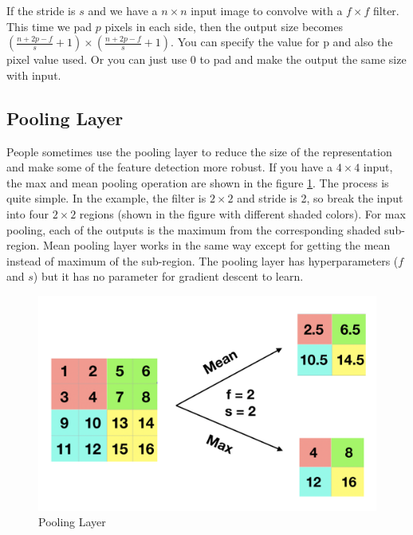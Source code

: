\documentclass[12pt,]{krantz}
\begin{document}
If the stride is \(s\) and we have a \(n \times n\) input image to convolve with a \(f \times f\) filter. This time we pad \(p\) pixels in each side, then the output size becomes \((\frac{n + 2p -f}{s} + 1) \times (\frac{n + 2p -f}{s} + 1)\). You can specify the value for p and also the pixel value used. Or you can just use 0 to pad and make the output the same size with input.

\hypertarget{pooling-layer}{%
\subsection{Pooling Layer}\label{pooling-layer}}

People sometimes use the pooling layer to reduce the size of the representation and make some of the feature detection more robust. If you have a \(4 \times 4\) input, the max and mean pooling operation are shown in the figure \ref{fig:poolinglayer}. The process is quite simple. In the example, the filter is \(2 \times 2\) and stride is 2, so break the input into four \(2 \times 2\) regions (shown in the figure with different shaded colors). For max pooling, each of the outputs is the maximum from the corresponding shaded sub-region. Mean pooling layer works in the same way except for getting the mean instead of maximum of the sub-region. The pooling layer has hyperparameters (\(f\) and \(s\)) but it has no parameter for gradient descent to learn.

\begin{figure}

{\centering \includegraphics[width=1\linewidth]{images/poolinglayer} 

}

\caption{Pooling Layer}\label{fig:poolinglayer}
\end{figure}
\end{document}
